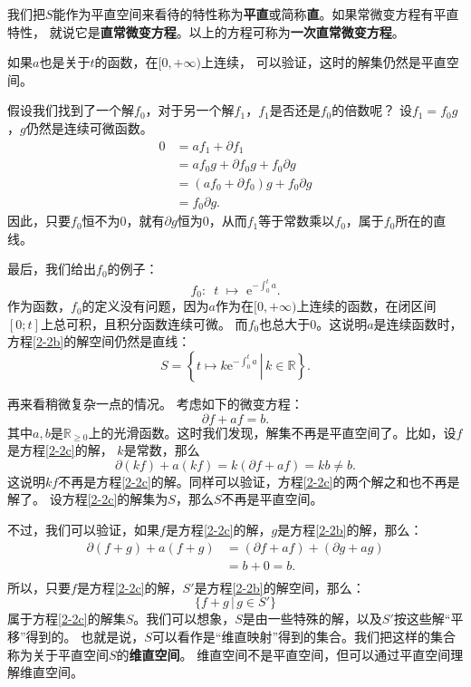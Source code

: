 \documentclass[12pt,UTF8]{ctexbook}
\newcommand{\e}{\mathrm{e}}
\theoremstyle{definition}
\theoremstyle{plain}
\begin{document}
我们把$S$能作为平直空间来看待的特性称为\textbf{平直}或简称\textbf{直}。如果常微变方程有平直特性，
就说它是\textbf{直常微变方程}。以上的方程可称为\textbf{一次直常微变方程}。

如果$a$也是关于$t$的函数，在$[0,+\infty)$上连续，
可以验证，这时的解集仍然是平直空间。

假设我们找到了一个解$f_0$，对于另一个解$f_1$，$f_1$是否还是$f_0$的倍数呢？
设$f_1 = f_0 g$，$g$仍然是连续可微函数。
\begin{align*}
    0 &= af_1 + \partial f_1 \\
    &= a f_0 g + \partial f_0 g + f_0 \partial g \\
    &= (af_0 + \partial f_0) g + f_0 \partial g \\
    &= f_0 \partial g.
\end{align*}
因此，只要$f_0$恒不为$0$，就有$\partial g$恒为$0$，从而$f_1$等于常数乘以$f_0$，属于$f_0$所在的直线。

最后，我们给出$f_0$的例子：
$$ f_0: \,\,\, t\,\, \mapsto \,\, \e^{-\int_0^t a}. $$
作为函数，$f_0$的定义没有问题，因为$a$作为在$[0,+\infty)$上连续的函数，在闭区间$[0; t]$上总可积，且积分函数连续可微。
而$f_0$也总大于$0$。这说明$a$是连续函数时，方程\eqref{2-2b}的解空间仍然是直线：
$$S = \left\{\left.t\mapsto k\e^{-\int_0^t a} \, \right| \, k\in\mathbb{R}\right\}.$$

再来看稍微复杂一点的情况。
考虑如下的微变方程：
\begin{equation}
    \partial f + a f = b. \label{2-2c}
\end{equation}
其中$a,b$是$\mathbb{R}_{\geqslant 0}$上的光滑函数。这时我们发现，解集不再是平直空间了。比如，设$f$是方程\eqref{2-2c}的解，
$k$是常数，那么
$$\partial (kf) + a (kf) = k (\partial f + a f) = kb \neq b.$$
这说明$kf$不再是方程\eqref{2-2c}的解。同样可以验证，方程\eqref{2-2c}的两个解之和也不再是解了。
设方程\eqref{2-2c}的解集为$S$，那么$S$不再是平直空间。

不过，我们可以验证，如果$f$是方程\eqref{2-2c}的解，$g$是方程\eqref{2-2b}的解，那么：
\begin{align*}
    \partial (f + g) + a (f + g) &= (\partial f + a f) + (\partial g + a g) \\
    &= b + 0 = b. \\ 
\end{align*}
所以，只要$f$是方程\eqref{2-2c}的解，$S'$是方程\eqref{2-2b}的解空间，那么：
$$ \{f + g \, | \, g\in S'\} $$
属于方程\eqref{2-2c}的解集$S$。我们可以想象，$S$是由一些特殊的解，以及$S'$按这些解“平移”得到的。
也就是说，$S$可以看作是“维直映射”得到的集合。我们把这样的集合称为关于平直空间$S$的\textbf{维直空间}。
维直空间不是平直空间，但可以通过平直空间理解维直空间。
\end{document}
